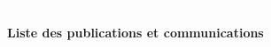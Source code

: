 \documentclass[11pt,a4paper, french]{article}
\begin{document}






\newpage
\textcolor{White}{.}
\vspace{-1.5cm}
\begin{center}
\begin{LARGE}
\textbf{Liste des publications et communications}\\
\end{LARGE}
\end{center}
\end{document}
